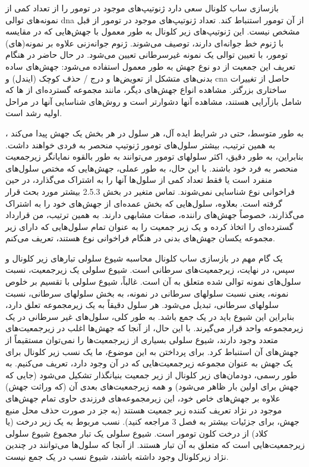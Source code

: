 بازسازی ساب کلونال سعی دارد ژنوتیپ‌های موجود در تومور را از تعداد کمی از نمونه‌های توالی \gls{dna} از آن تومور استنباط کند. تعداد ژنوتیپ‌های موجود در تومور از قبل مشخص نیست. این ژنوتیپ‌های زیر کلونال به طور معمول با جهش‌هایی که در مقایسه با ژنوم خط جوانه‌ای دارند، توصیف می‌شوند. ژنوم جوانه‌زنی علاوه بر نمونه(های) تومور، با تعیین توالی یک نمونه غیرسرطانی تعیین می‌شود. در حال حاضر در هنگام تعریف این جمعیت از دو نوع جهش به طور معمول استفاده می‌شود: جهش‌های ساده بدنی‌های متشکل از تعویض‌ها و درج / حذف کوچک (ایندل) و \gls{cna} حاصل از تغییرات ساختاری بزرگتر. مشاهده انواع جهش‌های دیگر، مانند مجموعه گسترده‌ای از ‌ها که شامل بازآرایی هستند، مشاهده آنها دشوارتر است و روش‌های شناسایی آنها در مراحل اولیه رشد است.


به طور متوسط، حتی در شرایط ایده آل، هر سلول در هر بخش یک جهش پیدا می‌کند \cite{behjati2014genome}، به همین ترتیب، بیشتر سلول‌های تومور ژنوتیپ منحصر به فردی خواهند داشت. بنابراین، به طور دقیق، اکثر سلولهای تومور می‌توانند به طور بالقوه نمایانگر زیرجمعیت منحصر به فرد خود باشند. با این حال، به طور عملی، جهش‌هایی که مختص سلول‌های منفرد است یا فقط تعداد کمی از سلول‌ها آنها را به اشتراک می‌گذارد، در حین فراخوانی نوع شناسایی نمی‌شوند. تماس متغیر در بخش 2.5.3 بیشتر مورد بحث قرار گرفته است. بعلاوه، سلول‌هایی که بخش عمده‌ای از جهش‌های خود را به اشتراک می‌گذارند، خصوصاً جهش‌های راننده، صفات مشابهی دارند. به همین ترتیب، من قرارداد گسترده‌ای را اتخاذ کرده و یک زیر جمعیت را به عنوان تمام سلول‌هایی که دارای زیر مجموعه یکسان جهش‌های بدنی در هنگام فراخوانی نوع هستند، تعریف می‌کنم.


یک گام مهم در بازسازی ساب کلونال محاسبه شیوع سلولی تبارهای زیر کلونال و سپس، در نهایت، زیرجمعیت‌های سرطانی است. شیوع سلولی یک زیرجمعیت، نسبت سلول‌های نمونه توالی شده متعلق به آن است. غالباً، شیوع سلولی با تقسیم بر خلوص نمونه، یعنی نسبت سلولهای سرطانی در نمونه، به بخش سلولهای سرطانی، نسبت سلولهای سرطانی، تبدیل می‌شود. هر سلول دقیقاً به یک زیرمجموعه تعلق دارد، بنابراین این شیوع باید در یک جمع باشد. به طور کلی، سلول‌های غیر سرطانی در یک زیرمجموعه واحد قرار می‌گیرند. با این حال، از آنجا که جهش‌ها اغلب در زیرجمعیت‌های متعدد وجود دارند، شیوع سلولی بسیاری از زیرجمعیت‌ها را نمی‌توان مستقیماً از جهش‌های آن استنباط کرد. برای پرداختن به این موضوع، ما یک نسب زیر کلونال برای یک جهش به عنوان مجموعه زیرجمعیت‌هایی که در آن وجود دارد، تعریف می‌کنیم. به طور رسمی، دودمان‌های زیر کلونال از زیر جمعیت بنیانگذار تشکیل می‌شود (جایی که جهش برای اولین بار ظاهر می‌شود) و همه زیرجمعیت‌های بعدی آن (که وراثت جهش) علاوه بر جهش‌های خاص خود، این زیرمجموعه‌های فرزندی حاوی تمام جهش‌های موجود در نژاد تعریف کننده زیر جمعیت هستند (به جز در صورت حذف محل منبع جهش، برای جزئیات بیشتر به فصل 3 مراجعه کنید). نسب مربوط به یک زیر درخت (یا کلاد) از درخت کلون تومور است. شیوع سلولی یک تبار مجموع شیوع سلولی زیرجمعیت‌هایی است که متعلق به آن تبار هستند. از آنجا که سلول‌ها می‌توانند در چندین نژاد زیرکلونال وجود داشته باشند، شیوع نسب در یک جمع نیست.



